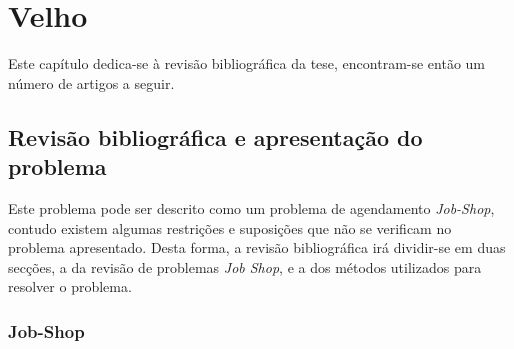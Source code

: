 
%

\chapter{Velho}
\label{cha:cont}

Este capítulo dedica-se à revisão bibliográfica da tese, encontram-se então um número de artigos a seguir.

\section{Revisão bibliográfica e apresentação do problema}
\label{sec:rev_bib_ap_pron}

Este problema pode ser descrito como um problema de agendamento \textit{Job-Shop}, contudo existem algumas restrições e suposições que não se verificam no problema apresentado. Desta forma, a revisão bibliográfica irá dividir-se em duas secções, a da revisão de problemas \textit{Job Shop}, e a dos métodos utilizados para  resolver o problema.\\

\subsection{Job-Shop}
\label{subsec:JS}

